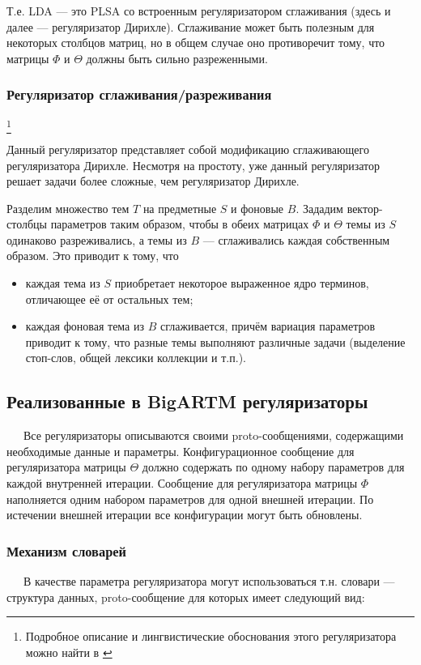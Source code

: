 Т.е. LDA --- это PLSA со встроенным регуляризатором сглаживания (здесь и далее --- регуляризатор Дирихле). Сглаживание может быть полезным для некоторых столбцов матриц, но в общем случае оно противоречит тому, что матрицы $\Phi$ и $\Theta$ должны быть сильно разреженными. 

\subsubsection{Регуляризатор сглаживания/разреживания}\label{smooth_sparse}
\footnote{Подробное описание и лингвистические обоснования этого регуляризатора можно найти в \cite{voron_potap_14}}

 Данный регуляризатор представляет собой модификацию сглаживающего регуляризатора Дирихле. Несмотря на простоту, уже данный регуляризатор решает задачи более сложные, чем регуляризатор Дирихле.

Разделим множество тем $T$ на предметные $S$ и фоновые $B$. Зададим вектор-столбцы параметров таким образом, чтобы в обеих матрицах $\Phi$ и $\Theta$ темы из $S$ одинаково разреживались, а темы из $B$ --- сглаживались каждая собственным образом. Это приводит к тому, что 

\begin{itemize}
	\item каждая тема из $S$ приобретает некоторое выраженное ядро терминов, отличающее её от остальных тем;
	\item каждая фоновая тема из $B$ сглаживается, причём вариация параметров приводит к тому, что разные темы выполняют различные задачи (выделение стоп-слов, общей лексики коллекции и т.п.).
\end{itemize}  

\subsection{Реализованные в BigARTM регуляризаторы}

$\quad\;\:$Все регуляризаторы описываются своими proto-сообщениями, содержащими необходимые данные и параметры. Конфигурационное сообщение для регуляризатора матрицы $\Theta$ должно содержать по одному набору параметров для каждой внутренней итерации. Сообщение для регуляризатора матрицы $\Phi$ наполняется одним набором параметров для одной внешней итерации. По истечении внешней итерации все конфигурации могут быть обновлены.

\subsubsection{Механизм словарей} 
$\quad\;\:$В качестве параметра регуляризатора могут использоваться т.н. словари --- структура данных, proto-сообщение для которых имеет следующий вид:

